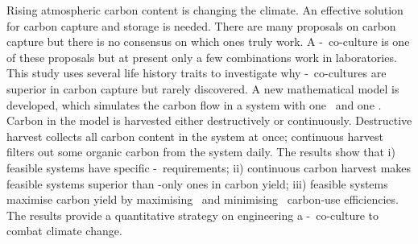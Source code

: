 \documentclass[../thesis.tex]{subfiles} %
\begin{document}
Rising atmospheric carbon content is changing the climate.  An effective solution for carbon capture and storage is needed.  There are many proposals on carbon capture but there is no consensus on which ones truly work.  A \phy-\bac\ co-culture is one of these proposals but at present only a few combinations work in laboratories.  This study uses several life history traits to investigate why \phy-\bac\ co-cultures are superior in carbon capture but rarely discovered.  A new mathematical model is developed, which simulates the carbon flow in a system with one \phy\ and one \bacm.  Carbon in the model is harvested either destructively or continuously.  Destructive harvest collects all carbon content in the system at once; continuous harvest filters out some organic carbon from the system daily.  The results show that \Rn{1}) feasible systems have specific \phy-\bac\ requirements; \Rn{2}) continuous carbon harvest makes feasible systems superior than \phy-only ones in carbon yield; \Rn{3}) feasible systems maximise carbon yield by maximising \phy\ and minimising \bac\ carbon-use efficiencies.  The results provide a quantitative strategy on engineering a \phy-\bac\ co-culture to combat climate change.
\end{document}
